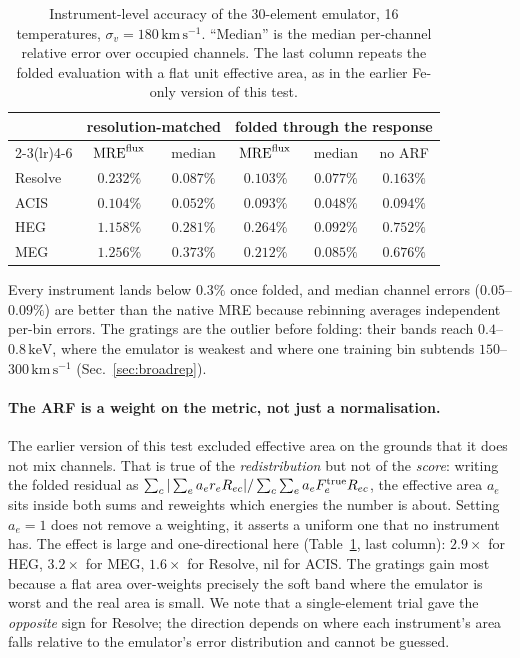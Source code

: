 \documentclass[11pt,a4paper]{article}
\newcommand{\mre}{\mathrm{MRE}}
\newcommand{\kev}{\,\mathrm{keV}}
\newcommand{\kms}{\,\mathrm{km\,s^{-1}}}
\begin{document}
\begin{table}[ht]
\centering
\begin{tabular}{lccccc}
\toprule
& \multicolumn{2}{c}{resolution-matched} & \multicolumn{3}{c}{folded through the response}\\
\cmidrule(lr){2-3}\cmidrule(lr){4-6}
& $\mre^{\rm flux}$ & median & $\mre^{\rm flux}$ & median & no ARF\\
\midrule
Resolve & $0.232\%$ & $0.087\%$ & $\mathbf{0.103\%}$ & $0.077\%$ & $0.163\%$\\
ACIS    & $0.104\%$ & $0.052\%$ & $\mathbf{0.093\%}$ & $0.048\%$ & $0.094\%$\\
HEG     & $1.158\%$ & $0.281\%$ & $\mathbf{0.264\%}$ & $0.092\%$ & $0.752\%$\\
MEG     & $1.256\%$ & $0.373\%$ & $\mathbf{0.212\%}$ & $0.085\%$ & $0.676\%$\\
\bottomrule
\end{tabular}
\caption{Instrument-level accuracy of the 30-element emulator, 16
temperatures, $\sigma_v=180\kms$. ``Median'' is the median per-channel
relative error over occupied channels. The last column repeats the
folded evaluation with a flat unit effective area, as in the earlier
Fe-only version of this test.}
\label{tab:p5}
\end{table}

Every instrument lands below $0.3\%$ once folded, and median channel
errors ($0.05$--$0.09\%$) are better than the native MRE because
rebinning averages independent per-bin errors. The gratings are the
outlier before folding: their bands reach $0.4$--$0.8\kev$, where the
emulator is weakest and where one training bin subtends
$150$--$300\kms$ (Sec.~\ref{sec:broadrep}).

\paragraph{The ARF is a weight on the metric, not just a
normalisation.} The earlier version of this test excluded effective
area on the grounds that it does not mix channels. That is true of the
\emph{redistribution} but not of the \emph{score}: writing the folded
residual as $\sum_c |\sum_e a_e r_e R_{ec}| / \sum_c\sum_e a_e F^{\rm
true}_e R_{ec}$, the effective area $a_e$ sits inside both sums and
reweights which energies the number is about. Setting $a_e=1$ does not
remove a weighting, it asserts a uniform one that no instrument has.
The effect is large and one-directional here (Table~\ref{tab:p5}, last
column): $2.9\times$ for HEG, $3.2\times$ for MEG, $1.6\times$ for
Resolve, nil for ACIS. The gratings gain most because a flat area
over-weights precisely the soft band where the emulator is worst and
the real area is small. We note that a single-element trial gave the
\emph{opposite} sign for Resolve; the direction depends on where each
instrument's area falls relative to the emulator's error distribution
and cannot be guessed.
\end{document}
